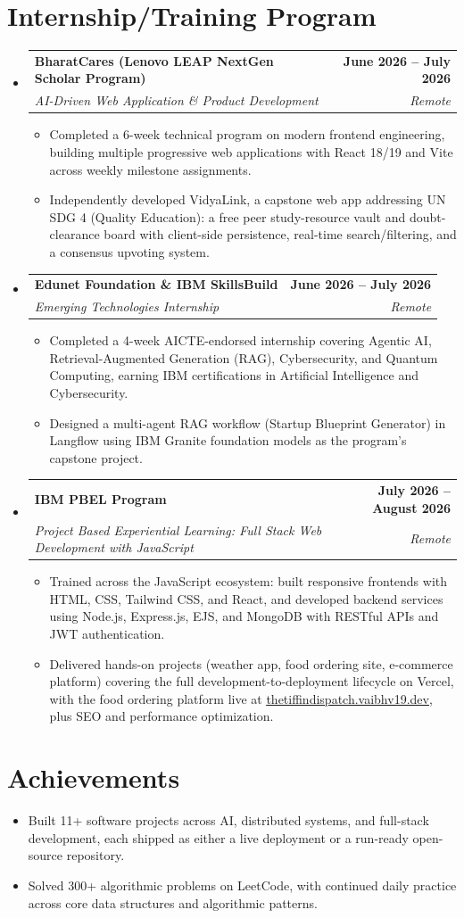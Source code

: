 \documentclass[letterpaper,10pt]{article}
\makeatletter
\newcommand{\resumeItem}[1]{
  \item\small{
    {#1 \vspace{-2pt}}
  }
}
\newcommand{\resumeSubheading}[4]{
  \vspace{-2pt}\item
    \begin{tabular*}{1.0\textwidth}[t]{l@{\extracolsep{\fill}}r}
      \textbf{#1} & \textbf{\small #2} \\
      \textit{\small#3} & \textit{\small #4} \\
    \end{tabular*}\vspace{-7pt}
}
\newcommand{\resumeSubHeadingListStart}{\begin{itemize}[leftmargin=0.0in, label={}]}
\newcommand{\resumeSubHeadingListEnd}{\end{itemize}}
\newcommand{\resumeItemListStart}{\begin{itemize}}
\newcommand{\resumeItemListEnd}{\end{itemize}\vspace{-5pt}}
\makeatother
\begin{document}
\section{Internship/Training Program}
  \resumeSubHeadingListStart
    \resumeSubheading
      {BharatCares (Lenovo LEAP NextGen Scholar Program)}{June 2026 -- July 2026}
      {AI-Driven Web Application \& Product Development}{Remote}
      \resumeItemListStart
        \resumeItem{Completed a 6-week technical program on modern frontend engineering, building multiple progressive web applications with React 18/19 and Vite across weekly milestone assignments.}
        \resumeItem{Independently developed VidyaLink, a capstone web app addressing UN SDG 4 (Quality Education): a free peer study-resource vault and doubt-clearance board with client-side persistence, real-time search/filtering, and a consensus upvoting system.}
      \resumeItemListEnd
    \resumeSubheading
      {Edunet Foundation \& IBM SkillsBuild}{June 2026 -- July 2026}
      {Emerging Technologies Internship}{Remote}
      \resumeItemListStart
        \resumeItem{Completed a 4-week AICTE-endorsed internship covering Agentic AI, Retrieval-Augmented Generation (RAG), Cybersecurity, and Quantum Computing, earning IBM certifications in Artificial Intelligence and Cybersecurity.}
        \resumeItem{Designed a multi-agent RAG workflow (Startup Blueprint Generator) in Langflow using IBM Granite foundation models as the program's capstone project.}
      \resumeItemListEnd
    \resumeSubheading
      {IBM PBEL Program}{July 2026 -- August 2026}
      {Project Based Experiential Learning: Full Stack Web Development with JavaScript}{Remote}
      \resumeItemListStart
        \resumeItem{Trained across the JavaScript ecosystem: built responsive frontends with HTML, CSS, Tailwind CSS, and React, and developed backend services using Node.js, Express.js, EJS, and MongoDB with RESTful APIs and JWT authentication.}
        \resumeItem{Delivered hands-on projects (weather app, food ordering site, e-commerce platform) covering the full development-to-deployment lifecycle on Vercel, with the food ordering platform live at \href{https://thetiffindispatch.vaibhv19.dev}{\underline{thetiffindispatch.vaibhv19.dev}}, plus SEO and performance optimization.}
      \resumeItemListEnd
  \resumeSubHeadingListEnd
\vspace{-12pt}

\section{Achievements}
      \resumeItemListStart
\resumeItem{Built 11+ software projects across AI, distributed systems, and full-stack development, each shipped as either a live deployment or a run-ready open-source repository.}
  \vspace{-16pt}
\resumeItem{Solved 300+ algorithmic problems on LeetCode, with continued daily practice across core data structures and algorithmic patterns.}
     \resumeItemListEnd
\end{document}
